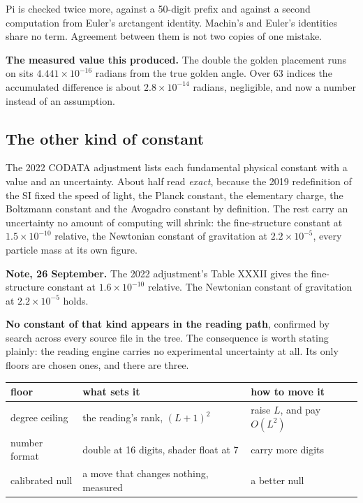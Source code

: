 Pi is checked twice more, against a 50-digit prefix and against a second computation from Euler's arctangent identity. Machin's and Euler's identities share no term. Agreement between them is not two copies of one mistake.

\textbf{The measured value this produced.} The double the golden placement runs on sits \(4.441 \times 10^{-16}\) radians from the true golden angle. Over \(63\) indices the accumulated difference is about \(2.8 \times 10^{-14}\) radians, negligible, and now a number instead of an assumption.

\subsection{The other kind of constant}

The 2022 CODATA adjustment lists each fundamental physical constant with a value and an uncertainty. About half read \emph{exact}, because the 2019 redefinition of the SI fixed the speed of light, the Planck constant, the elementary charge, the Boltzmann constant and the Avogadro constant by definition. The rest carry an uncertainty no amount of computing will shrink: the fine-structure constant at \(1.5 \times 10^{-10}\) relative, the Newtonian constant of gravitation at \(2.2 \times 10^{-5}\), every particle mass at its own figure.

\textbf{Note, 26 September.} The 2022 adjustment's Table XXXII gives the fine-structure constant at \(1.6 \times 10^{-10}\) relative. The Newtonian constant of gravitation at \(2.2 \times 10^{-5}\) holds.

\textbf{No constant of that kind appears in the reading path}, confirmed by search across every source file in the tree. The consequence is worth stating plainly: the reading engine carries no experimental uncertainty at all. Its only floors are chosen ones, and there are three.

\begin{center}
\begin{tabular}{@{}lll@{}}
\toprule
floor & what sets it & how to move it \\
\midrule
degree ceiling & the reading's rank, \((L+1)^2\) & raise \(L\), and pay \(O(L^2)\) \\
number format & double at 16 digits, shader float at 7 & carry more digits \\
calibrated null & a move that changes nothing, measured & a better null \\
\bottomrule
\end{tabular}
\end{center}

